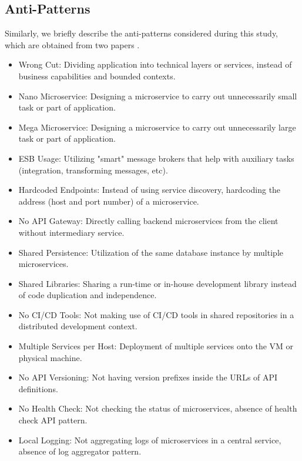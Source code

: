 \documentclass[11pt,a4paper,twocolumn]{article}
\begin{document}
\subsection{Anti-Patterns}
\label{subsec:anti-patterns}

Similarly, we briefly describe the anti-patterns considered during this study, which are obtained from two papers \cite{9522227}\cite{10.1145/3424771.3424812}.

\begin{itemize}
    \item Wrong Cut: Dividing application into technical layers or services, instead of business capabilities and bounded contexts.
    \item Nano Microservice: Designing a microservice to carry out unnecessarily small task or part of application.
    \item Mega Microservice: Designing a microservice to carry out unnecessarily large task or part of application.
    \item ESB Usage: Utilizing "smart" message brokers that help with auxiliary tasks (integration, transforming messages, etc).
    \item Hardcoded Endpoints: Instead of using service discovery, hardcoding the address (host and port number) of a microservice.
    \item No API Gateway: Directly calling backend microservices from the client without intermediary service.
    \item Shared Persistence: Utilization of the same database instance by multiple microservices.
    \item Shared Libraries: Sharing a run-time or in-house development library instead of code duplication and independence.
    \item No CI/CD Tools: Not making use of CI/CD tools in shared repositories in a distributed development context.
    \item Multiple Services per Host: Deployment of multiple services onto the VM or physical machine.
    \item No API Versioning: Not having version prefixes inside the URLs of API definitions.
    \item No Health Check: Not checking the status of microservices, absence of health check API pattern.
    \item Local Logging: Not aggregating logs of microservices in a central service, absence of log aggregator pattern.
\end{itemize}
\end{document}

